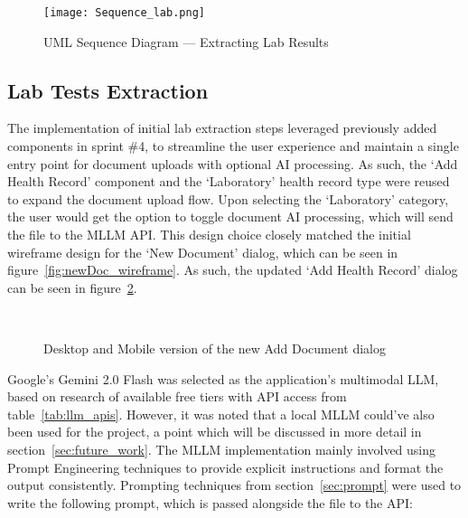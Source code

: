 \begin{figure}[htbp]
  \centering
  \texttt{[image: Sequence\_lab.png]}
  \caption{UML Sequence Diagram --- Extracting Lab Results}\label{fig:sequence_lab}
\end{figure}

\subsection{Lab Tests Extraction}

The implementation of initial lab extraction steps leveraged previously added components in sprint \#4, to streamline the user experience and maintain a single entry point for document uploads with optional AI processing. As such, the `Add Health Record' component and the `Laboratory' health record type were reused to expand the document upload flow. Upon selecting the `Laboratory' category, the user would get the option to toggle document AI processing, which will send the file to the MLLM API\@. This design choice closely matched the initial wireframe design for the `New Document' dialog, which can be seen in figure~\ref{fig:newDoc_wireframe}. As such, the updated `Add Health Record' dialog can be seen in figure~\ref{fig:labs_addDoc}.

\begin{figure}[ht]
  \centering
  \\[\baselineskip]
  \caption{Desktop and Mobile version of the new Add Document dialog}\label{fig:labs_addDoc}
\end{figure}

\FloatBarrier{}

Google's Gemini 2.0 Flash was selected as the application's multimodal LLM, based on research of available free tiers with API access from table~\ref{tab:llm_apis}. However, it was noted that a local MLLM could've also been used for the project, a point which will be discussed in more detail in section~\ref{sec:future_work}. The MLLM implementation mainly involved using Prompt Engineering techniques to provide explicit instructions and format the output consistently. Prompting techniques from section~\ref{sec:prompt} were used to write the following prompt, which is passed alongside the file to the API:

